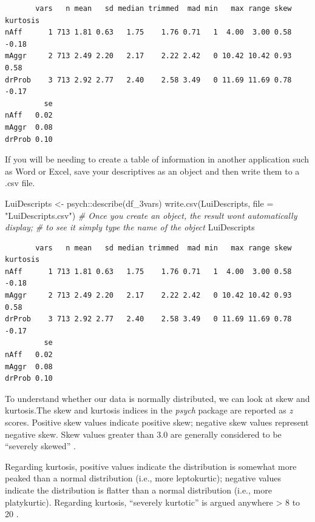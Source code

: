 \documentclass[
  11pt,
]{book}
\newenvironment{Shaded}{\begin{snugshade}}{\end{snugshade}}
\newcommand{\AttributeTok}[1]{\textcolor[rgb]{0.77,0.63,0.00}{#1}}
\newcommand{\CommentTok}[1]{\textcolor[rgb]{0.56,0.35,0.01}{\textit{#1}}}
\newcommand{\FunctionTok}[1]{\textcolor[rgb]{0.00,0.00,0.00}{#1}}
\newcommand{\NormalTok}[1]{#1}
\newcommand{\OtherTok}[1]{\textcolor[rgb]{0.56,0.35,0.01}{#1}}
\newcommand{\SpecialCharTok}[1]{\textcolor[rgb]{0.00,0.00,0.00}{#1}}
\newcommand{\StringTok}[1]{\textcolor[rgb]{0.31,0.60,0.02}{#1}}
\begin{document}
\begin{verbatim}
       vars   n mean   sd median trimmed  mad min   max range skew kurtosis
nAff      1 713 1.81 0.63   1.75    1.76 0.71   1  4.00  3.00 0.58    -0.18
mAggr     2 713 2.49 2.20   2.17    2.22 2.42   0 10.42 10.42 0.93     0.58
drProb    3 713 2.92 2.77   2.40    2.58 3.49   0 11.69 11.69 0.78    -0.17
         se
nAff   0.02
mAggr  0.08
drProb 0.10
\end{verbatim}

If you will be needing to create a table of information in another application such as Word or Excel, save your descriptives as an object and then write them to a .csv file.

\begin{Shaded}
\begin{Highlighting}[]
\NormalTok{LuiDescripts }\OtherTok{\textless{}{-}}\NormalTok{ psych}\SpecialCharTok{::}\FunctionTok{describe}\NormalTok{(df\_3vars)}
\FunctionTok{write.csv}\NormalTok{(LuiDescripts, }\AttributeTok{file =} \StringTok{"LuiDescripts.csv"}\NormalTok{)}
\CommentTok{\# Once you create an object, the result won\textquotesingle{}t automatically display;}
\CommentTok{\# to see it simply type the name of the object}
\NormalTok{LuiDescripts}
\end{Highlighting}
\end{Shaded}

\begin{verbatim}
       vars   n mean   sd median trimmed  mad min   max range skew kurtosis
nAff      1 713 1.81 0.63   1.75    1.76 0.71   1  4.00  3.00 0.58    -0.18
mAggr     2 713 2.49 2.20   2.17    2.22 2.42   0 10.42 10.42 0.93     0.58
drProb    3 713 2.92 2.77   2.40    2.58 3.49   0 11.69 11.69 0.78    -0.17
         se
nAff   0.02
mAggr  0.08
drProb 0.10
\end{verbatim}

To understand whether our data is normally distributed, we can look at skew and kurtosis.The skew and kurtosis indices in the \emph{psych} package are reported as \emph{z} scores. Positive skew values indicate positive skew; negative skew values represent negative skew. Skew values greater than 3.0 are generally considered to be ``severely skewed'' \citep{kline_principles_2016}.

Regarding kurtosis, positive values indicate the distribution is somewhat more peaked than a normal distribution (i.e., more leptokurtic); negative values indicate the distribution is flatter than a normal distribution (i.e., more platykurtic). Regarding kurtosis, ``severely kurtotic'' is argued anywhere \textgreater{} 8 to 20 \citep{kline_principles_2016}.
\end{document}
